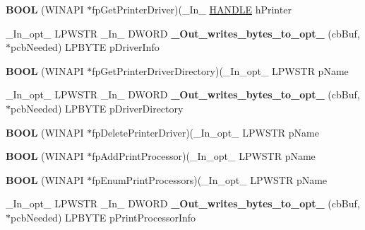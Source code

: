 \begin{DoxyCompactItemize}
{\bfseries B\+O\+OL} (W\+I\+N\+A\+PI $\ast$fp\+Get\+Printer\+Driver)(\+\_\+\+In\+\_\+ \hyperlink{interfacevoid}{H\+A\+N\+D\+LE} h\+Printer
\item 
\mbox{\label{struct___p_r_i_n_t_p_r_o_v_i_d_o_r_ab6a7f3660ac0daf3ae5a1728e3b191f9}} 
\+\_\+\+In\+\_\+opt\+\_\+ L\+P\+W\+S\+TR \+\_\+\+In\+\_\+ D\+W\+O\+RD {\bfseries \+\_\+\+Out\+\_\+writes\+\_\+bytes\+\_\+to\+\_\+opt\+\_\+} (cb\+Buf, $\ast$pcb\+Needed) L\+P\+B\+Y\+TE p\+Driver\+Info
\item 
\mbox{\label{struct___p_r_i_n_t_p_r_o_v_i_d_o_r_aae942d3457e664cda208b7347df46c24}} 
{\bfseries B\+O\+OL} (W\+I\+N\+A\+PI $\ast$fp\+Get\+Printer\+Driver\+Directory)(\+\_\+\+In\+\_\+opt\+\_\+ L\+P\+W\+S\+TR p\+Name
\item 
\mbox{\label{struct___p_r_i_n_t_p_r_o_v_i_d_o_r_a192ccb44d1f90218530ff478b96b5534}} 
\+\_\+\+In\+\_\+opt\+\_\+ L\+P\+W\+S\+TR \+\_\+\+In\+\_\+ D\+W\+O\+RD {\bfseries \+\_\+\+Out\+\_\+writes\+\_\+bytes\+\_\+to\+\_\+opt\+\_\+} (cb\+Buf, $\ast$pcb\+Needed) L\+P\+B\+Y\+TE p\+Driver\+Directory
\item 
\mbox{\label{struct___p_r_i_n_t_p_r_o_v_i_d_o_r_a745655cee8aefacea0fcfe4c7c06ec24}} 
{\bfseries B\+O\+OL} (W\+I\+N\+A\+PI $\ast$fp\+Delete\+Printer\+Driver)(\+\_\+\+In\+\_\+opt\+\_\+ L\+P\+W\+S\+TR p\+Name
\item 
\mbox{\label{struct___p_r_i_n_t_p_r_o_v_i_d_o_r_aa48390516e2630c2a622f059d7b830ae}} 
{\bfseries B\+O\+OL} (W\+I\+N\+A\+PI $\ast$fp\+Add\+Print\+Processor)(\+\_\+\+In\+\_\+opt\+\_\+ L\+P\+W\+S\+TR p\+Name
\item 
\mbox{\label{struct___p_r_i_n_t_p_r_o_v_i_d_o_r_aafc9c8a496e6af232b6698ca12a3a905}} 
{\bfseries B\+O\+OL} (W\+I\+N\+A\+PI $\ast$fp\+Enum\+Print\+Processors)(\+\_\+\+In\+\_\+opt\+\_\+ L\+P\+W\+S\+TR p\+Name
\item 
\mbox{\label{struct___p_r_i_n_t_p_r_o_v_i_d_o_r_a2b7f096505eafb7b112d2c57876fb384}} 
\+\_\+\+In\+\_\+opt\+\_\+ L\+P\+W\+S\+TR \+\_\+\+In\+\_\+ D\+W\+O\+RD {\bfseries \+\_\+\+Out\+\_\+writes\+\_\+bytes\+\_\+to\+\_\+opt\+\_\+} (cb\+Buf, $\ast$pcb\+Needed) L\+P\+B\+Y\+TE p\+Print\+Processor\+Info

\end{DoxyCompactItemize}

